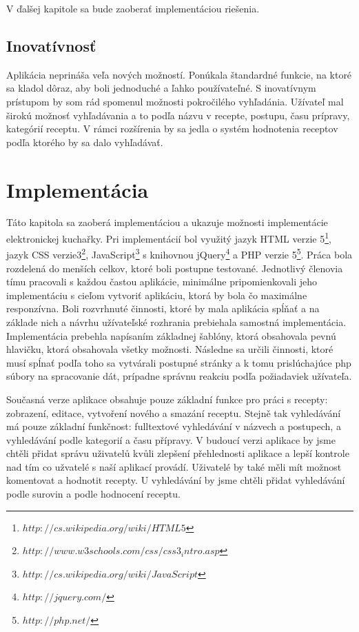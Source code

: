 \documentclass[12pt,a4paper,titlepage,final]{article}
\begin{document}
 V ďalšej kapitole sa bude zaoberať implementáciou riešenia. 

\subsection{Inovatívnosť}
Aplikácia neprináša veľa nových možností. Ponúkala štandardné funkcie, na ktoré sa kladol dôraz, aby boli jednoduché a ľahko používateľné. S inovatívnym prístupom by som rád spomenul možnosti pokročilého vyhľadánia. Užívateľ mal širokú možnosť vyhľadávania a to podľa názvu v recepte, postupu, času prípravy, kategórií receptu. V rámci rozšírenia by sa jedla o systém hodnotenia receptov podľa ktorého by sa dalo vyhľadávať.



\section{Implementácia}
Táto kapitola sa zaoberá implementáciou a ukazuje možnosti implementácie elektronickej kuchařky. Pri implementácií bol využitý jazyk HTML verzie 5\footnote{$http://cs.wikipedia.org/wiki/HTML5$}, jazyk CSS verzie3\footnote{$http://www.w3schools.com/css/css3_intro.asp$}, JavaScript\footnote{$http://cs.wikipedia.org/wiki/JavaScript$} s knihovnou jQuery\footnote{$http://jquery.com/$} a PHP verzie 5\footnote{$http://php.net/$}. Práca bola rozdelená do menších celkov, ktoré boli postupne testované. Jednotlivý členovia tímu pracovali s každou častou aplikácie, minimálne pripomienkovali jeho implementáciu s cieľom vytvoriť aplikáciu, ktorá by bola čo maximálne responzívna. Boli rozvrhnuté činnosti, ktoré by mala aplikácia spĺňať a na základe nich a návrhu užívateľské rozhrania prebiehala samostná implementácia. Implementácia prebehla napísaním základnej šablóny, ktorá obsahovala pevnú hlavičku, ktorá obsahovala všetky možnosti. Následne sa určili činnosti, ktoré musí spĺnať podľa toho sa vytvárali postupné stránky a k tomu prislúchajúce php súbory na spracovanie dát, prípadne správnu reakciu podľa požiadaviek užívateľa.\cite{Prokop:Algoritmy}

Současná verze aplikace obsahuje pouze základní funkce pro práci s recepty: zobrazení, editace, vytvoření nového a smazání receptu. Stejně tak vyhledávání má pouze základní funkčnost: fulltextové vyhledávání v názvech a postupech, a vyhledávání podle kategorií a času přípravy. V budoucí verzi aplikace by jsme chtěli přidat správu uživatelů kvůli zlepšení přehlednosti aplikace a lepší kontrole nad tím co užvatelé s naší aplikací provádí. Uživatelé by také měli mít možnost komentovat a hodnotit recepty. U vyhledávání by jsme chtěli přidat vyhledávání podle surovin a podle hodnocení receptu. 
\end{document}
